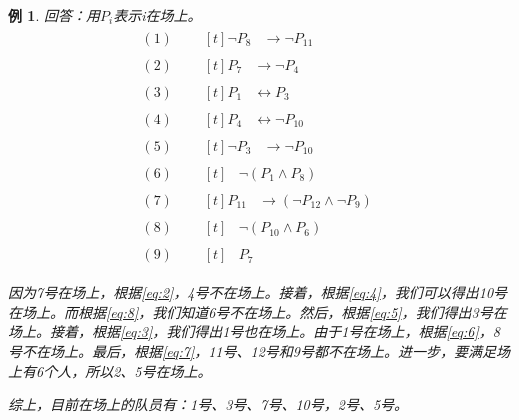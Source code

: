 \documentclass[12pt,onecolumn,a4paper]{book}
\newtheorem*{example}{例}
\numberwithin{table}{subsection}
\numberwithin{equation}{subsection}
\begin{document}
\begin{example}
    回答：用$P_i$表示i在场上。
    \begin{align}
        (1) \quad & \begin{aligned}[t]
        \lnot P_8 &\rightarrow \lnot P_{11}
        \end{aligned} \label{eq:1} \\
        (2) \quad & \begin{aligned}[t]
        P_7 &\rightarrow \lnot P_4
        \end{aligned} \label{eq:2} \\
        (3) \quad & \begin{aligned}[t]
        P_1 &\leftrightarrow P_3
        \end{aligned} \label{eq:3} \\
        (4) \quad & \begin{aligned}[t]
        P_4 &\leftrightarrow \lnot P_{10}
        \end{aligned} \label{eq:4} \\
        (5) \quad & \begin{aligned}[t]
        \lnot P_3 &\rightarrow \lnot P_{10}
        \end{aligned} \label{eq:5} \\
        (6) \quad & \begin{aligned}[t]
        &\lnot (P_1 \land P_8)
        \end{aligned} \label{eq:6} \\
        (7) \quad & \begin{aligned}[t]
        P_{11} &\rightarrow (\lnot P_{12} \land \lnot P_9)
        \end{aligned} \label{eq:7} \\
        (8) \quad & \begin{aligned}[t]
        &\lnot (P_{10} \land P_6)
        \end{aligned} \label{eq:8} \\
        (9) \quad & \begin{aligned}[t]
        &P_7
        \end{aligned} \label{eq:9}
    \end{align}

    因为7号在场上，根据\ref{eq:2}，4号不在场上。接着，根据\ref{eq:4}，我们可以得出10号在场上。而根据\ref{eq:8}，我们知道6号不在场上。然后，根据\ref{eq:5}，我们得出3号在场上。接着，根据\ref{eq:3}，我们得出1号也在场上。由于1号在场上，根据\ref{eq:6}，8号不在场上。最后，根据\ref{eq:7}，11号、12号和9号都不在场上。进一步，要满足场上有6个人，所以2、5号在场上。

    综上，目前在场上的队员有：1号、3号、7号、10号，2号、5号。
\end{example}
\end{document}
